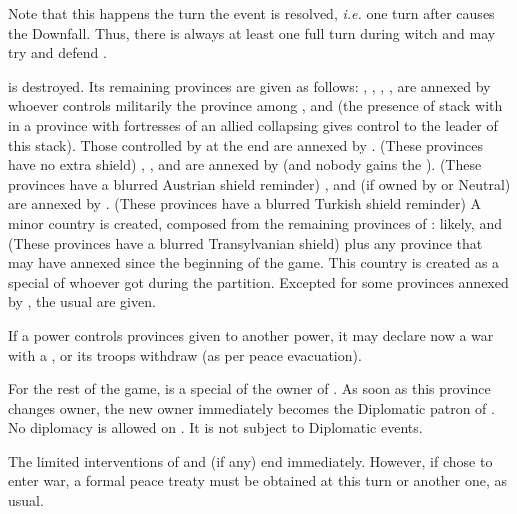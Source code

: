 \phpaix
\aparag Note that this happens the turn the event is resolved, \emph{i.e.} one
turn after \TUR causes the Downfall. Thus, there is always at least one full
turn during witch \HAB and \POL may try and defend \paysHongrie.

\aparag \paysHongrie is destroyed. Its remaining provinces are given as
follows:
\bparag \provincePecs, \provinceCroatie, \provinceHongrie, \provinceKarpatok,
\provinceBukovina are annexed by whoever controls militarily the province
among \TUR, \HAB and \POL (the presence of stack with \ARMY\faceplus in a
province with fortresses of an allied collapsing \paysHongrie gives control to
the leader of this stack). Those controlled by \paysHongrie at the end are
annexed by \HAB. (These provinces have no extra shield)
\bparag \provinceSzlovakia, \provinceBalaton, \provinceKranj and
\provinceKapela are annexed by \HAB (and nobody gains the \VP). (These
provinces have a blurred Austrian shield reminder)
\bparag \provinceBanat, \provinceSerbia and \provinceBosnia (if owned by
\paysHongrie or Neutral) are annexed by \TUR. (These provinces have a blurred
Turkish shield reminder)
\bparag A minor country \paysTransylvanie is created, composed from the
remaining provinces of \paysHongrie: likely, \provinceErdely and
\provinceMures (These provinces have a blurred Transylvanian shield) plus any
province that \paysHongrie may have annexed since the beginning of the
game. This country is created as a special \VASSAL of whoever got
\provinceHongrie during the partition.
\bparag Excepted for some provinces annexed by \HAB, the usual \VP are given.

\aparag If a power controls provinces given to another power, it may declare
now a war with a \CB, or its troops withdraw (as per peace evacuation).

\aparag[\paysTransylvanie] [BLP] For the rest of the game, \paysTransylvanie
is a special \VASSAL of the owner of \provinceHongrie.
\bparag As soon as this province changes owner, the new owner immediately
becomes the Diplomatic patron of \paysTransylvanie.
\bparag No diplomacy is allowed on \paysTransylvanie. It is not subject to
Diplomatic events.

\aparag The limited interventions of \HAB and \POL (if any) end immediately.
\bparag However, if \HAB chose to enter war, a formal peace treaty must be
obtained at this turn or another one, as usual.


